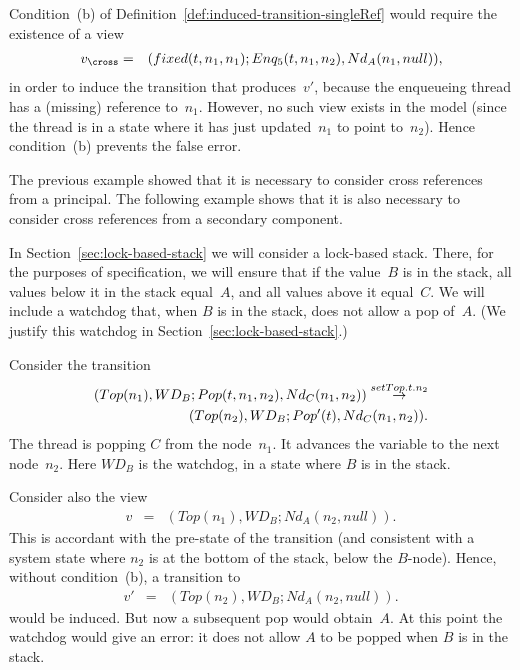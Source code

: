 {Condition~(b) of Definition~\ref{def:induced-transition-singleRef} would
require the existence of a view
\begin{eqnarray*}
v_\cross & = & (fixed(t, n_1, n_1); Enq_5(t, n_1, n_2), Nd_A(n_1, null)),
\end{eqnarray*}
in order to induce the transition that produces~$v'$, because the enqueueing
thread has a (missing) reference to~$n_1$.  However, no such view exists in
the model (since the thread is in a state where it has just updated~$n_1$ to
point to~$n_2$).  Hence condition~(b) prevents the false error.


The previous example showed that it is necessary to consider cross references
from a principal.  The following example shows that it is also necessary to
consider cross references from a secondary component.  

In Section~\ref{sec:lock-based-stack} we will consider a lock-based stack.
There, for the purposes of specification, we will ensure that if the value~$B$
is in the stack, all values below it in the stack equal~$A$, and all values
above it equal~$C$.  We will include a watchdog that, when $B$ is in the
stack, does not allow a pop of~$A$.  (We justify this watchdog in
Section~\ref{sec:lock-based-stack}.) 

Consider the transition
\[
\begin{align}
(Top(n_1), WD_B ; Pop(t, n_1, n_2), Nd_C(n_1, n_2)) \stackrel{setTop.t.n_2}\rightarrow \\
\qquad  (Top(n_2), WD_B ; Pop'(t), Nd_C(n_1, n_2)) .
\end{align}
\]
The thread is popping $C$ from the node~$n_1$.  It advances the
 variable to the next node~$n_2$.  Here $WD_B$ is the watchdog, in
a state where $B$ is in the stack.  

Consider also the view
\begin{eqnarray*}
v & = & (Top(n_1), WD_B ;  Nd_A(n_2, null)).
\end{eqnarray*}
This is accordant with the pre-state of the transition (and consistent with a
system state where $n_2$ is at the bottom of the stack, below the $B$-node).
Hence, without condition~(b), a transition to
\begin{eqnarray*}
v' & = & (Top(n_2), WD_B ;  Nd_A(n_2, null)).
\end{eqnarray*}
would be induced.  But now a subsequent pop would obtain~$A$.  At this point
the watchdog would give an error: it does not allow $A$ to be popped when $B$
is in the stack.

}
